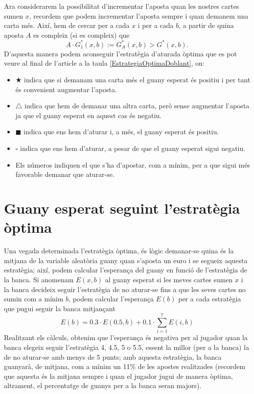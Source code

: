 \documentclass[9pt]{IEEEtran}
\begin{document}
Ara considerarem la possibilitat d'incrementar l'aposta quan les nostres cartes sumen $x$, recordem que podem incrementar l'aposta sempre i quan demanem una carta més. Així, hem de cercar per a cada $x$ i per a cada $b$, a partir de quina aposta $A$ es compleix (si es compleix) que 
$$A \cdot G_1^*(x,b) := G^*_A(x,b)>G^*(x,b).$$
D'aquesta manera podem aconseguir l'estratègia d'aturada òptima que es pot veure al final de l'article a la taula \ref{EstrategiaOptimaDoblant}, on:

\begin{itemize}
\item $\bigstar$ indica que si demanam una carta més el guany esperat  és positiu i per tant és convenient augmentar l'aposta. 
\item $\triangle$ indica que hem de demanar una altra carta, però sense augmentar l'aposta ja que el guany esperat en aquest cas és negatiu.
\item $\blacksquare$ indica que ens hem d'aturar i, a més, el guany esperat és positiu.
\item $\square$ indica que ens hem d'aturar, a pesar de que el guany esperat sigui negatiu.
\item Els números indiquen el que s'ha d'apostar, com a mínim, per a que sigui més favorable demanar que aturar-se.
\end{itemize}

\section{Guany esperat seguint l'estratègia òptima}

Una vegada determinada l'estratègia òptima, és lògic demanar-se quina és la mitjana de la variable aleatòria guany quan s'aposta un euro i se segueix aquesta estratègia; així, podem calcular l'esperança del guany en funció de l'estratègia de la banca. Si anomenam $E(x,b)$ al guany esperat si les meves cartes sumen $x$ i la banca decideix seguir l'estratègia de no aturar-se fins a que les seves cartes no sumin com a mínim $b$, podem calcular l'esperança $E(b)$ per a cada estratègia que pugui seguir la banca mitjançant
$$E(b) = 0.3 \cdot E(0.5,b) + 0.1 \cdot \sum_{i=1}^7 E(i,b)$$
Realitzant els càlculs, obtenim que l'esperança és negativa per al jugador quan la banca elegeix seguir l'estratègia 4, 4.5, 5 o 5.5, essent la millor (per a la banca) la de no aturar-se amb menys de 5 punts; amb aquesta estratègia, la banca guanyarà, de mitjana, com a mínim un 11\% de les apostes realitzades (recordem que aquesta és la mitjana sempre i quan el jugador jugui de manera òptima, altrament, el percentatge de guanys per a la banca seran majors).
\end{document}
